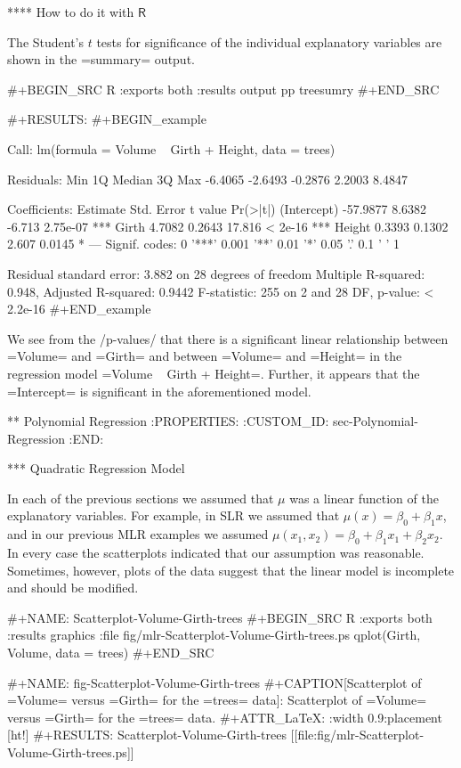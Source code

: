 **** How to do it with \(\mathsf{R}\)

The Student's \(t\) tests for significance of the individual explanatory variables are shown in the =summary= output.

#+BEGIN_SRC R :exports both :results output pp 
treesumry
#+END_SRC

#+RESULTS:
#+BEGIN_example

Call:
lm(formula = Volume ~ Girth + Height, data = trees)

Residuals:
    Min      1Q  Median      3Q     Max 
-6.4065 -2.6493 -0.2876  2.2003  8.4847 

Coefficients:
            Estimate Std. Error t value Pr(>|t|)    
(Intercept) -57.9877     8.6382  -6.713 2.75e-07 ***
Girth         4.7082     0.2643  17.816  < 2e-16 ***
Height        0.3393     0.1302   2.607   0.0145 *  
---
Signif. codes:  0 '***' 0.001 '**' 0.01 '*' 0.05 '.' 0.1 ' ' 1

Residual standard error: 3.882 on 28 degrees of freedom
Multiple R-squared:  0.948,	Adjusted R-squared:  0.9442 
F-statistic:   255 on 2 and 28 DF,  p-value: < 2.2e-16
#+END_example

We see from the /p-values/ that there is a significant linear
relationship between =Volume= and =Girth= and between =Volume= and
=Height= in the regression model =Volume ~ Girth + Height=. Further,
it appears that the =Intercept= is significant in the aforementioned
model.

** Polynomial Regression
:PROPERTIES:
:CUSTOM_ID: sec-Polynomial-Regression
:END:

*** Quadratic Regression Model

In each of the previous sections we assumed that \(\mu\) was a linear
function of the explanatory variables. For example, in SLR we assumed
that \(\mu(x)=\beta_{0}+\beta_{1}x\), and in our previous MLR examples
we assumed \(\mu(x_{1},x_{2}) = \beta_{0}+\beta_{1}x_{1} +
\beta_{2}x_{2}\). In every case the scatterplots indicated that our
assumption was reasonable. Sometimes, however, plots of the data
suggest that the linear model is incomplete and should be modified.

#+NAME: Scatterplot-Volume-Girth-trees
#+BEGIN_SRC R :exports both :results graphics :file fig/mlr-Scatterplot-Volume-Girth-trees.ps
qplot(Girth, Volume, data = trees)
#+END_SRC

#+NAME: fig-Scatterplot-Volume-Girth-trees
#+CAPTION[Scatterplot of =Volume= versus =Girth= for the =trees= data]: \small Scatterplot of =Volume= versus =Girth= for the =trees= data.
#+ATTR_LaTeX: :width 0.9\textwidth :placement [ht!]
#+RESULTS: Scatterplot-Volume-Girth-trees
[[file:fig/mlr-Scatterplot-Volume-Girth-trees.ps]]

